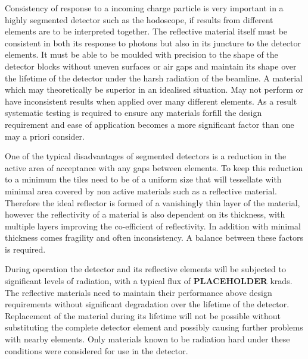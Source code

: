 Consistency of response to a incoming charge particle is very important in a highly segmented detector such as the hodoscope, if results from different elements are to be interpreted together. The reflective material itself must be consistent in both its response to photons but also in its juncture to the detector elements. It must be able to be moulded with precision to the shape of the detector blocks without uneven surfaces or air gaps and maintain its shape over the lifetime of the detector under the harsh radiation of the beamline. A material which may theoretically be superior in an idealised situation. May not perform or have inconsistent results when applied over many different elements. As a result systematic testing is required to ensure any materials forfill the design requirement and ease of application becomes a more significant factor than one may a priori consider.

One of the typical disadvantages of segmented detectors is a reduction in the active area of acceptance with any gaps between elements. To keep this reduction to a minimum the tiles need to be of a uniform size that will tessellate with minimal area covered by non active materials such as a reflective material. Therefore the ideal reflector is formed of a vanishingly thin layer of the material, however the reflectivity of a material is also dependent on its thickness, with multiple layers improving the co-efficient of reflectivity. In addition with minimal thickness comes fragility and often inconsistency. A balance between these factors is required.

During operation the detector and its reflective elements will be subjected to significant levels of radiation, with a typical flux of \textbf{PLACEHOLDER} krads. The reflective materials need to maintain their performance above design requirements without significant degradation over the lifetime of the detector. Replacement of the material during its lifetime will not be possible without substituting the complete detector element and possibly causing further problems with nearby elements. Only materials known to be radiation hard under these conditions were considered for use in the detector.  

